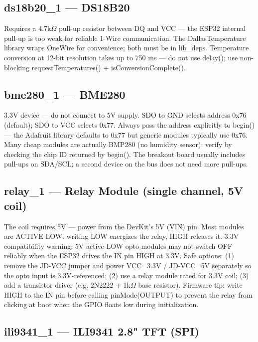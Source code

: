 \documentclass[a4paper,11pt]{article}
\begin{document}
\subsection{ds18b20\_1 --- DS18B20}

Requires a 4.7k\ensuremath{\Omega} pull-up resistor between DQ and VCC --- the ESP32 internal pull-up is too weak for reliable 1-Wire communication. The DallasTemperature library wraps OneWire for convenience; both must be in lib\_deps. Temperature conversion at 12-bit resolution takes up to 750 ms --- do not use delay(); use non-blocking requestTemperatures() + isConversionComplete().

\subsection{bme280\_1 --- BME280}

3.3V device --- do not connect to 5V supply. SDO to GND selects address 0x76 (default); SDO to VCC selects 0x77. Always pass the address explicitly to begin() --- the Adafruit library defaults to 0x77 but generic modules typically use 0x76. Many cheap modules are actually BMP280 (no humidity sensor): verify by checking the chip ID returned by begin(). The breakout board usually includes pull-ups on SDA/SCL; a second device on the bus does not need more pull-ups.

\subsection{relay\_1 --- Relay Module (single channel, 5V coil)}

The coil requires 5V --- power from the DevKit's 5V (VIN) pin. Most modules are ACTIVE LOW: writing LOW energizes the relay, HIGH releases it. 3.3V compatibility warning: 5V active-LOW opto modules may not switch OFF reliably when the ESP32 drives the IN pin HIGH at 3.3V. Safe options: (1) remove the JD-VCC jumper and power VCC=3.3V / JD-VCC=5V separately so the opto input is 3.3V-referenced; (2) use a relay module rated for 3.3V coil; (3) add a transistor driver (e.g. 2N2222 + 1k\ensuremath{\Omega} base resistor). Firmware tip: write HIGH to the IN pin before calling pinMode(OUTPUT) to prevent the relay from clicking at boot when the GPIO floats low during initialization.

\subsection{ili9341\_1 --- ILI9341 2.8" TFT (SPI)}
\end{document}
